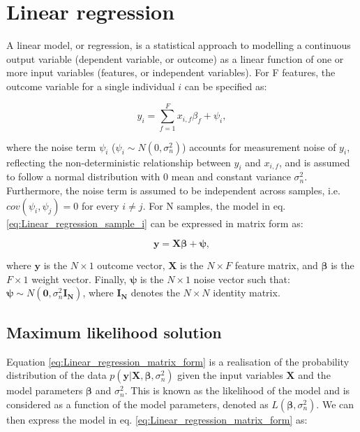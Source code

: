 
\section{Linear regression} 
\label{sec:linear_regression}

A linear model, or regression, is a statistical approach to modelling a continuous output variable (dependent variable, or outcome) as a linear function of one or more input variables (features, or independent variables). 
For F features, the outcome variable for a single individual $i$ can be specified as:

\begin{equation} \label{eq:Linear_regression_sample_i}
 y_i = \sum_{f=1}^{F} x_{i,f}\beta_f + \psi_i,
\end{equation}

where the noise term $\psi_i$ ($ \psi_i \sim N(0, \sigma_n^2)$) accounts for measurement noise of $y_i$, reflecting the non-deterministic relationship between $y_i$ and $x_{i,f}$, and is assumed to follow a normal distribution with 0 mean and constant variance $\sigma_n^2$. 
Furthermore, the noise term is assumed to be independent across samples, i.e. $cov(\psi_i, \psi_j)=0$ for every $i \neq j$. 
For N samples, the model in eq. \eqref{eq:Linear_regression_sample_i} can be expressed in matrix form as:

\begin{equation} \label{eq:Linear_regression_matrix_form}
\mathbf{y} = \mathbf{X}\boldsymbol{\beta} + \boldsymbol{\psi}, 
\end{equation}

where $\mathbf{y}$ is the $N \times 1$ outcome vector, $\mathbf{X}$ is the $N \times F$ feature matrix, and $\boldsymbol{\beta}$ is the $F \times 1$ weight vector. 
Finally, $\boldsymbol{\psi}$ is the $N \times 1$ noise vector such that: $\boldsymbol{\psi}\sim N(\mathbf{0}, \sigma_n^2 \mathbf{I_N})$, where $\mathbf{I_N}$ denotes the $N \times N$ identity matrix. \\ 


\subsection{Maximum likelihood solution}

Equation \eqref{eq:Linear_regression_matrix_form} is a realisation of the probability distribution of the data $p(\mathbf{y}| \mathbf{X}, \boldsymbol{\beta}, \sigma_n^2)$ given the input variables $\mathbf{X}$ and the model parameters $\boldsymbol{\beta}$ and $\sigma_n^2$.
This is known as the likelihood of the model and is considered as a function of the model parameters, denoted as $L(\boldsymbol{\beta}, \sigma_n^2)$. 
We can then express the model in eq. \eqref{eq:Linear_regression_matrix_form} as:

